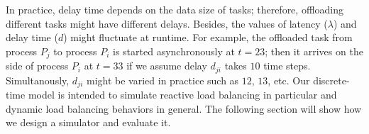 In practice, delay time depends on the data size of tasks; therefore, offloading different tasks might have different delays. Besides, the values of latency ($\lambda$) and delay time ($d$) might fluctuate at runtime. For example, the offloaded task from process $P_{j}$ to process $P_{i}$ is started asynchronously at $t=23$; then it arrives on the side of process $P_{i}$ at $t=33$ if we assume delay $d_{ji}$ takes $10$ time steps. Simultanously, $d_{ji}$ might be varied in practice such as $12$, $13$, etc. Our discrete-time model is intended to simulate reactive load balancing in particular and dynamic load balancing behaviors in general. The following section will show how we design a simulator and evaluate it.

